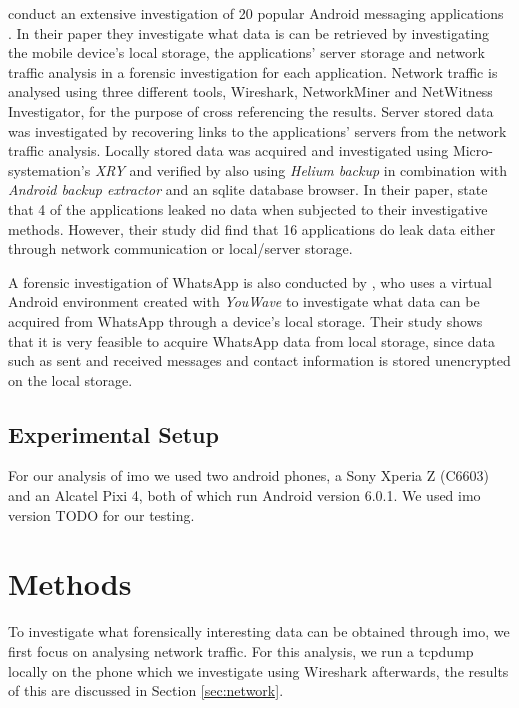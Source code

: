 \documentclass[conference]{IEEEtran}
\begin{document}
\citeauthor{walnycky2015network} conduct an extensive investigation of 20
popular Android messaging applications \cite{walnycky2015network}. In their
paper they investigate what data is can be retrieved by investigating the mobile
device's local storage, the applications' server storage and network traffic
analysis in a forensic investigation for each application. Network traffic is
analysed using three different tools, Wireshark, NetworkMiner and NetWitness
Investigator, for the purpose of cross referencing the results. Server stored
data was investigated by recovering links to the applications' servers from the
network traffic analysis. Locally stored data was acquired and investigated
using Micro-systemation's {\it XRY} and verified by also using {\it Helium
backup} in combination with {\it Android backup extractor} and an sqlite
database browser.  In their paper, \citeauthor{walnycky2015network} state that 4
of the applications leaked no data when subjected to their investigative
methods.  However, their study did find that 16 applications do leak data either
through network communication or local/server storage.

A forensic investigation of WhatsApp is also conducted by
\citeauthor{anglano2014forensic} \cite{anglano2014forensic}, who uses a virtual
Android environment created with {\it YouWave} to investigate what data can be
acquired from WhatsApp through a device's local storage. Their study shows that
it is very feasible to acquire WhatsApp data from local storage, since data such
as sent and received messages and contact information is stored unencrypted on
the local storage.

\subsection{Experimental Setup}\label{sec:setup}

For our analysis of imo we used two android phones, a Sony Xperia Z (C6603) and
an Alcatel Pixi 4, both of which run Android version 6.0.1. We used imo
version TODO for our testing. %


\section{Methods}\label{sec:method}

To investigate what forensically interesting data can be obtained through imo,
we first focus on analysing network traffic. For this analysis, we run a tcpdump
locally on the phone which we investigate using Wireshark afterwards, the
results of this are discussed in Section \ref{sec:network}.
\end{document}
